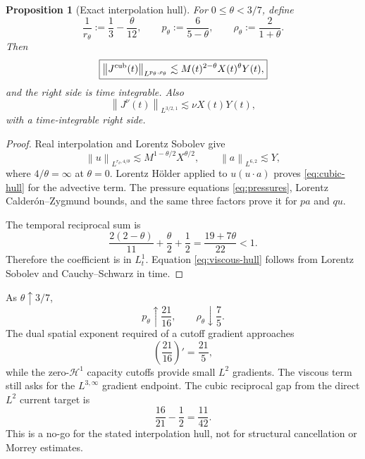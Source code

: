 \documentclass[11pt]{article}
\newtheorem{proposition}[theorem]{Proposition}
\theoremstyle{remark}
\newcommand{\norm}[1]{\left\|#1\right\|}
\newcommand{\HH}{\mathcal H}
\begin{document}
\begin{proposition}[Exact interpolation hull]
\label{prop:hull}
For \(0\leq\theta<3/7\), define
\[
 \frac1{r_\theta}:=\frac13-\frac{\theta}{12},
 \qquad
 p_\theta:=\frac6{5-\theta},
 \qquad
 \rho_\theta:=\frac2{1+\theta}.
\]
Then
\begin{equation}
 \label{eq:cubic-hull}
 \boxed{
 \norm{J^{\rm cub}(t)}_{L^{p_\theta,\rho_\theta}}
 \lesssim
 M(t)^{2-\theta}X(t)^\theta Y(t),
 }
\end{equation}
and the right side is time integrable.  Also
\begin{equation}
 \label{eq:viscous-hull}
 \boxed{
 \norm{J^\nu(t)}_{L^{3/2,1}}
 \lesssim\nu X(t)Y(t),
 }
\end{equation}
with a time-integrable right side.
\end{proposition}

\begin{proof}
Real interpolation and Lorentz Sobolev give
\[
 \norm{u}_{L^{r_\theta,4/\theta}}
 \lesssim
 M^{1-\theta/2}X^{\theta/2},
 \qquad
 \norm{a}_{L^{6,2}}\lesssim Y,
\]
where \(4/\theta=\infty\) at \(\theta=0\).
Lorentz H\"older applied to \(u(u\cdot a)\) proves
\eqref{eq:cubic-hull} for the advective term.  The pressure equations
\eqref{eq:pressures}, Lorentz Calder\'on--Zygmund bounds, and the same
three factors prove it for \(pa\) and \(qu\).

The temporal reciprocal sum is
\[
 \frac{2(2-\theta)}{11}
 +\frac{\theta}{2}
 +\frac12
 =
 \frac{19+7\theta}{22}<1.
\]
Therefore the coefficient is in \(L^1_t\).  Equation
\eqref{eq:viscous-hull} follows from Lorentz Sobolev and
Cauchy--Schwarz in time.
\end{proof}

As \(\theta\uparrow3/7\),
\begin{equation}
 \label{eq:hull-endpoint}
 p_\theta\uparrow\frac{21}{16},
 \qquad
 \rho_\theta\downarrow\frac75.
\end{equation}
The dual spatial exponent required of a cutoff gradient approaches
\[
 \left(\frac{21}{16}\right)'=\frac{21}{5},
\]
while the zero-\(\HH^1\) capacity cutoffs provide small \(L^2\)
gradients.  The viscous term still asks for the \(L^{3,\infty}\)
gradient endpoint.  The cubic reciprocal gap from the direct
\(L^2\) current target is
\begin{equation}
 \label{eq:capacity-gap}
 \boxed{
 \frac{16}{21}-\frac12=\frac{11}{42}.
 }
\end{equation}
This is a no-go for the stated interpolation hull, not for structural
cancellation or Morrey estimates.
\end{document}

